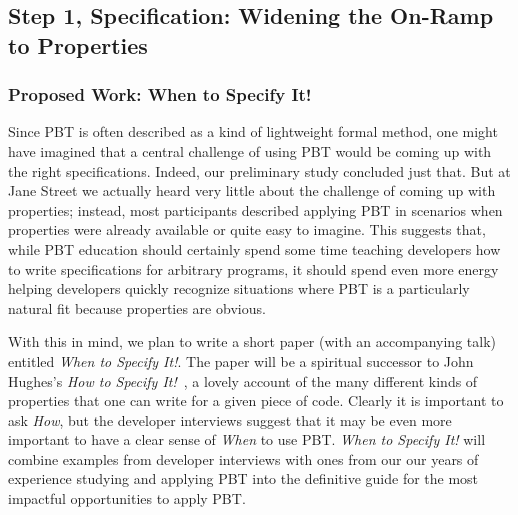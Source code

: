 \subsection{Step 1, Specification: Widening the On-Ramp to Properties }\label{sec:spec}
\subsubsection{Proposed Work: When to Specify It!}
Since PBT is often described as a kind of lightweight formal method, one might
have imagined that a central challenge of using PBT would be coming up with the
right specifications. Indeed, our preliminary study concluded just that. But at
Jane Street we actually heard very little about the challenge of coming up with
properties; instead, most participants described applying PBT in scenarios when
properties were already available or quite easy to imagine. This suggests that,
while PBT education should certainly spend some time teaching developers how to
write specifications for arbitrary programs, it should spend even more energy
helping developers quickly recognize  situations where PBT is a particularly
natural fit because properties are obvious.

With this in mind, we plan to write a short paper (with an accompanying talk)
entitled {\em When to Specify It!}. The paper will be a spiritual successor to
John Hughes's {\em How to Specify It!}~\cite{HowToSpecifyIt}, a lovely account
of the many different kinds of properties that one can write for a given piece
of code. Clearly it is important to ask {\em How}, but the developer interviews
suggest that it may be even more important to have a clear sense of {\em When}
to use PBT. {\em When to Specify It!} will combine examples from developer
interviews with ones from our our years of experience studying and applying PBT
into the definitive guide for the most impactful opportunities to apply PBT.

